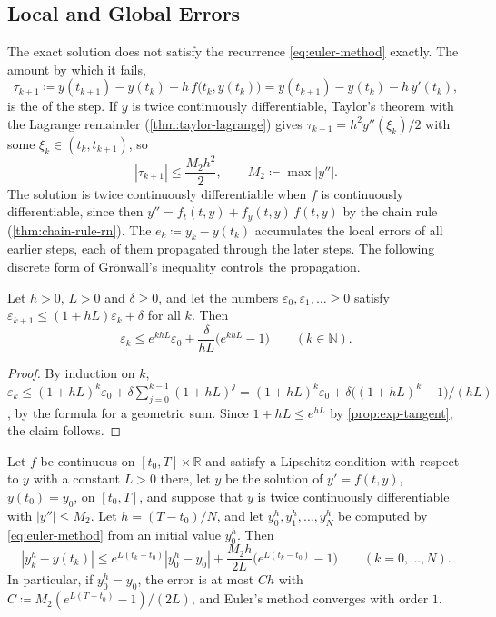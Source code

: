 \subsection{Local and Global Errors}

The exact solution does not satisfy the recurrence \eqref{eq:euler-method} exactly. The amount by which it fails,
\[
\tau_{k+1}\coloneqq y(t_{k+1})-y(t_k)-h\,f\bigl(t_k,y(t_k)\bigr)=y(t_{k+1})-y(t_k)-h\,y'(t_k),
\]
is the  of the step. If $y$ is twice continuously differentiable, Taylor's theorem with the Lagrange remainder (\cref{thm:taylor-lagrange}) gives $\tau_{k+1}=h^2y''(\xi_k)/2$ with some $\xi_k\in(t_k,t_{k+1})$, so
\[
|\tau_{k+1}|\le\frac{M_2h^2}2,\qquad M_2\coloneqq\max|y''| .
\]
The solution is twice continuously differentiable when $f$ is continuously differentiable, since then $y''=f_t(t,y)+f_y(t,y)\,f(t,y)$ by the chain rule (\cref{thm:chain-rule-rn}). The  $e_k\coloneqq y_k-y(t_k)$ accumulates the local errors of all earlier steps, each of them propagated through the later steps. The following discrete form of Gr\"onwall's inequality controls the propagation.

\begin{lemma}
\label{lem:discrete-gronwall}
Let $h>0$, $L>0$ and $\delta\ge0$, and let the numbers $\varepsilon_0,\varepsilon_1,\ldots\ge0$ satisfy $\varepsilon_{k+1}\le(1+hL)\varepsilon_k+\delta$ for all $k$. Then
\[
\varepsilon_k\le e^{khL}\varepsilon_0+\frac\delta{hL}\bigl(e^{khL}-1\bigr)\qquad(k\in\mathbb N).
\]
\end{lemma}

\begin{proof}
By induction on $k$, $\varepsilon_k\le(1+hL)^k\varepsilon_0+\delta\sum_{j=0}^{k-1}(1+hL)^j=(1+hL)^k\varepsilon_0+\delta\bigl((1+hL)^k-1\bigr)/(hL)$, by the formula for a geometric sum. Since $1+hL\le e^{hL}$ by \cref{prop:exp-tangent}, the claim follows.
\end{proof}

\begin{theorem}
\label{thm:euler-convergence}
Let $f$ be continuous on $[t_0,T]\times\mathbb R$ and satisfy a Lipschitz condition with respect to $y$ with a constant $L>0$ there, let $y$ be the solution of $y'=f(t,y)$, $y(t_0)=y_0$, on $[t_0,T]$, and suppose that $y$ is twice continuously differentiable with $|y''|\le M_2$. Let $h=(T-t_0)/N$, and let $y_0^h,y_1^h,\ldots,y_N^h$ be computed by \eqref{eq:euler-method} from an initial value $y_0^h$. Then
\[
|y_k^h-y(t_k)|\le e^{L(t_k-t_0)}|y_0^h-y_0|+\frac{M_2h}{2L}\bigl(e^{L(t_k-t_0)}-1\bigr)\qquad(k=0,\ldots,N).
\]
In particular, if $y_0^h=y_0$, the error is at most $Ch$ with $C\coloneqq M_2(e^{L(T-t_0)}-1)/(2L)$, and Euler's method converges with order $1$.
\end{theorem}

